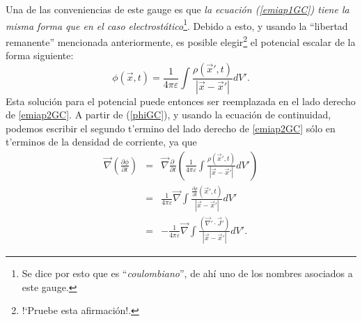 Una de las conveniencias de este gauge es que \textit{la ecuación (\ref{emiap1GC}) tiene la misma forma que en el caso electrostático}\footnote{Se dice por esto que es ``\textit{coulombiano}'', de ahí uno de los nombres asociados a este gauge.}. Debido a esto, y usando la ``libertad remanente'' mencionada anteriormente, es posible elegir\footnote{!`Pruebe esta afirmación!.} el potencial escalar de la forma siguiente:
\begin{equation}\label{phiGC}
\boxed{ \phi(\vec{x},t)=\frac{1}{4\pi\varepsilon}\int\frac{\rho(\vec{x}',t)}{\left|\vec{x}-\vec{x}'\right|}dV'.}
\end{equation}
Esta solución para el potencial puede entonces ser reemplazada en el lado derecho de \eqref{emiap2GC}. 
A partir de (\ref{phiGC}), y usando la ecuación de continuidad, podemos escribir el segundo t'ermino del lado derecho de \eqref{emiap2GC} sólo en t'erminos de la densidad de corriente, ya que
\begin{eqnarray}
\vec{\nabla}\left(\frac{\partial\phi }{\partial t}\right)&=&  \vec{\nabla}\frac{\partial\ }{\partial t}\left(\frac{1}{4\pi\varepsilon}\int\frac{\rho(\vec{x}',t)}{\left|\vec{x}-\vec{x}'\right|}dV'\right) \\
&=&  \frac{1}{4\pi\varepsilon}\vec{\nabla}\int\frac{\frac{\partial\rho }{\partial t}(\vec{x}',t)}{\left|\vec{x}-\vec{x}'\right|}dV' \\
&=& - \frac{1}{4\pi\varepsilon} \vec{\nabla}\int\frac{(\vec{\nabla}'\cdot\vec{J}')}{\left|\vec{x}-\vec{x}'\right|}dV' .%
\end{eqnarray}
